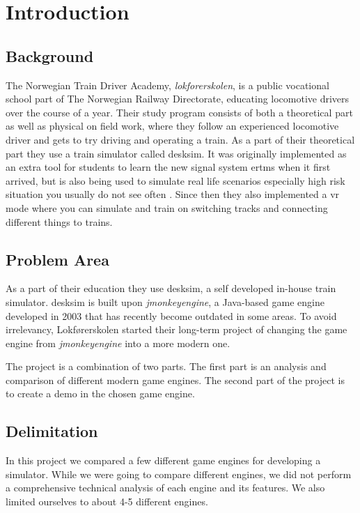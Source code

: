 \chapter{Introduction} %
\raggedbottom %

\section{Background}

The Norwegian Train Driver Academy, \textit{\Gls{lokforerskolen}}, is a public vocational school part of The Norwegian Railway Directorate, educating locomotive drivers over the course of a year. Their study program consists of both a theoretical part as well as physical on field work, where they follow an experienced locomotive driver and gets to try driving and operating a train. As a part of their theoretical part they use a train simulator called \Gls{desksim}. It was originally implemented as an extra tool for students to learn the new signal system \acrshort{ertms} when it first arrived, but is also being used to simulate real life scenarios especially high risk situation you usually do not see often \cite{lokforerskolen}. Since then they also implemented a \acrshort{vr} mode where you can simulate and train on switching tracks and connecting different things to trains.

\section{Problem Area}

As a part of their education they use \Gls{desksim}, a self developed in-house train simulator. \Gls{desksim} is built upon \textit{\Gls{jmonkeyengine}}, a Java-based game engine developed in 2003 that has recently become outdated in some areas. To avoid irrelevancy, Lokførerskolen started their long-term project of changing the game engine from \textit{\Gls{jmonkeyengine}} into a more modern one.

The project is a combination of two parts. The first part is an analysis and comparison of different modern game engines. The second part of the project is to create a demo in the chosen game engine.

\section{Delimitation}

In this project we compared a few different game engines for developing a simulator. While we were going to compare different engines, we did not perform a comprehensive technical analysis of each engine and its features. We also limited ourselves to about 4-5 different engines. 

